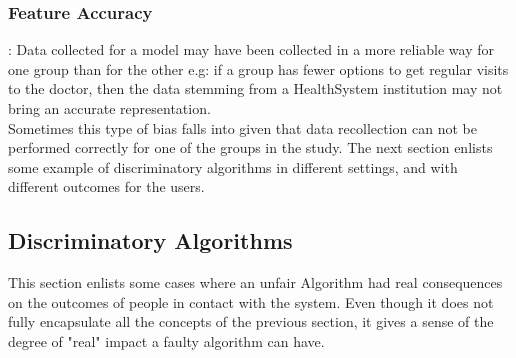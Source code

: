 \subsubsection{Feature Accuracy}:
Data collected for a model may have been collected in a more reliable way for one group than for the other e.g: if a group has fewer options to get regular visits to the doctor, then the data stemming from a HealthSystem institution may not bring an accurate representation. \\
Sometimes this type of bias falls into  given that data recollection can not be performed correctly for one of the groups in the study.
The next section enlists some example of discriminatory algorithms in different settings, and with different outcomes for the users.
\subsection{Discriminatory Algorithms}
\label{discexamples}
This section enlists some cases where an unfair Algorithm had real consequences on the outcomes of people in contact with the system. Even though it does not fully encapsulate all the concepts of the previous section, it gives a sense of the degree of "real" impact a faulty algorithm can have.
